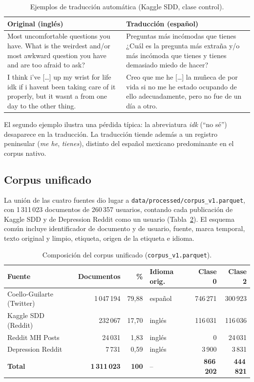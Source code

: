 \documentclass[12pt,a4paper]{article}
\begin{document}
\begin{table}[H]
\centering
\footnotesize
\caption{Ejemplos de traducción automática (Kaggle SDD, clase control).}
\label{tab:ejemplos_traduccion}
\begin{tabularx}{\textwidth}{XX}
\toprule
\textbf{Original (inglés)} & \textbf{Traducción (español)} \\
\midrule
Most uncomfortable questions you have. What is the weirdest and/or most awkward question you have and are too afraid to ask? & Preguntas más incómodas que tienes ¿Cuál es la pregunta más extraña y/o más incómoda que tienes y tienes demasiado miedo de hacer? \\
\addlinespace
I think i've [\dots] up my wrist for life idk if i havent been taking care of it properly, but it wasnt a from one day to the other thing. & Creo que me he [\dots] la muñeca de por vida si no me he estado ocupando de ello adecuadamente, pero no fue de un día a otro. \\
\bottomrule
\end{tabularx}
\end{table}

El segundo ejemplo ilustra una pérdida típica: la abreviatura \emph{idk} (``no sé'') desaparece en la traducción. La traducción tiende además a un registro peninsular (\emph{me he}, \emph{tienes}), distinto del español mexicano predominante en el corpus nativo.

\subsection{Corpus unificado}
\label{sec:corpus_unificado}
La unión de las cuatro fuentes dio lugar a \texttt{data/processed/corpus\_v1.parquet}, con 1\,311\,023 documentos de 260\,357 usuarios, contando cada publicación de Kaggle SDD y de Depression Reddit como un usuario (Tabla~\ref{tab:corpus_stats}). El esquema común incluye identificador de documento y de usuario, fuente, marca temporal, texto original y limpio, etiqueta, origen de la etiqueta e idioma.

\begin{table}[H]
\centering
\small
\caption{Composición del corpus unificado (\texttt{corpus\_v1.parquet}).}
\label{tab:corpus_stats}
\begin{tabular}{lrrlrr}
\toprule
\textbf{Fuente} & \textbf{Documentos} & \textbf{\%} & \textbf{Idioma orig.} & \textbf{Clase 0} & \textbf{Clase 2} \\
\midrule
Coello-Guilarte (Twitter) & 1\,047\,194 & 79{,}88 & español   & 746\,271 & 300\,923 \\
Kaggle SDD (Reddit)       &   232\,067  & 17{,}70 & inglés    & 116\,031 & 116\,036 \\
Reddit MH Posts           &    24\,031  &  1{,}83 & inglés    &        0 &  24\,031 \\
Depression Reddit         &     7\,731  &  0{,}59 & inglés    &   3\,900 &   3\,831 \\
\midrule
\textbf{Total} & \textbf{1\,311\,023} & \textbf{100} & -- & \textbf{866\,202} & \textbf{444\,821} \\
\bottomrule
\end{tabular}
\end{table}
\end{document}
